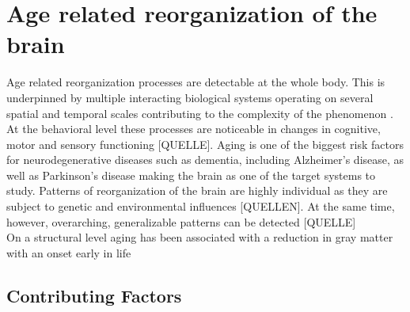 \section{Age related reorganization of the brain}
Age related reorganization processes are detectable at the whole body. This is underpinned by multiple interacting biological systems operating on several spatial and temporal scales contributing to the complexity of the phenomenon \cite{Mooney2016}. At the behavioral level these processes are noticeable in changes in cognitive, motor and sensory functioning [QUELLE]. Aging is one of the biggest risk factors for neurodegenerative diseases such as dementia, including Alzheimer's disease, as well as Parkinson's disease making the brain as one of the target systems to study. Patterns of reorganization of the brain are highly individual as they are subject to genetic and environmental influences [QUELLEN]. At the same time, however, overarching, generalizable patterns can be detected [QUELLE]\\
On a structural level aging has been associated with a reduction in gray matter with an onset early in life 

\subsection{Contributing Factors}


